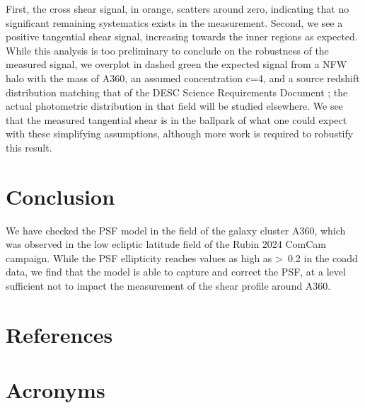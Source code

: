 \documentclass[SE,lsstdraft,authoryear,toc]{lsstdoc}
\begin{document}
First, the cross shear signal, in orange, scatters around zero, indicating that no significant remaining systematics exists in the measurement. Second, we see a positive tangential shear signal, increasing towards the inner regions as expected. While this analysis is too preliminary to conclude on the robustness of the measured signal, we overplot in dashed green the expected signal from a NFW halo with the mass of A360, an assumed concentration c=4, and a source redshift distribution matching that of the DESC Science Requirements Document \citep{2018arXiv180901669T}; the actual photometric distribution in that field will be studied elsewhere. We see that the measured tangential shear is in the ballpark of what one could expect with these simplifying assumptions, although more work is required to robustify this result.


\section{Conclusion}
We have checked the PSF model in the field of the galaxy cluster A360, which was observed in the low ecliptic latitude field of the Rubin 2024 ComCam campaign. While the PSF ellipticity reaches values as high as >~0.2 in the coadd data, we find that the model is able to capture and correct the PSF, at a level sufficient not to impact the measurement of the shear profile around A360. 


\appendix
\section{References} \label{sec:bib}
\renewcommand{\refname}{} %


\section{Acronyms} \label{sec:acronyms}

\end{document}
